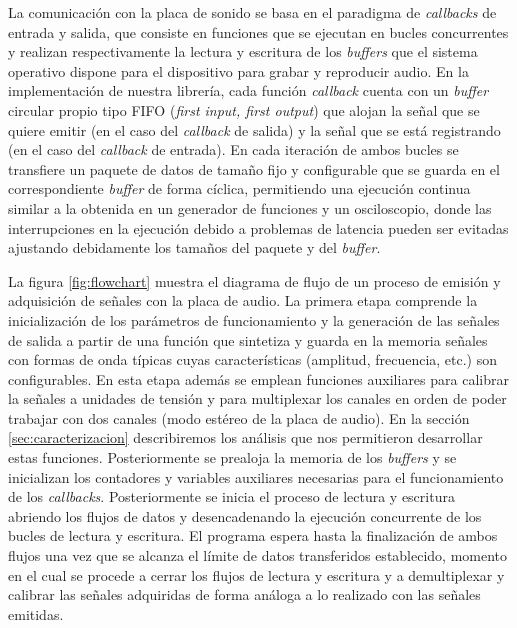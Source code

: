 \documentclass[a4paper,11pt]{article}
\begin{document}
	La comunicación con la placa de sonido se basa en el paradigma de \emph{callbacks} de entrada y salida, que consiste en funciones que se ejecutan en bucles concurrentes y realizan respectivamente la lectura y escritura de los \emph{buffers} que el sistema operativo dispone para el dispositivo para grabar y reproducir audio. En la implementación de nuestra librería, cada función \emph{callback} cuenta con un \emph{buffer} circular propio tipo FIFO (\emph{first input, first output}) que alojan la señal que se quiere emitir (en el caso del \emph{callback} de salida) y la señal que se está registrando (en el caso del \emph{callback} de entrada). En cada iteración de ambos bucles se transfiere un paquete de datos de tamaño fijo y configurable que se guarda en el correspondiente \emph{buffer} de forma cíclica, permitiendo una ejecución continua similar a la obtenida en un generador de funciones y un osciloscopio, donde las interrupciones en la ejecución debido a problemas de latencia pueden ser evitadas ajustando debidamente los tamaños del paquete y del \emph{buffer}.

	La figura \ref{fig:flowchart} muestra el diagrama de flujo de un proceso de emisión y adquisición de señales con la placa de audio. La primera etapa comprende la inicialización de los parámetros de funcionamiento y la generación de las señales de salida a partir de una función que sintetiza y guarda en la memoria señales con formas de onda típicas cuyas características (amplitud, frecuencia, etc.) son configurables. En esta etapa además se emplean funciones auxiliares para calibrar la señales a unidades de tensión y para multiplexar los canales en orden de poder trabajar con dos canales (modo estéreo de la placa de audio). En la sección \ref{sec:caracterizacion} describiremos los análisis que nos permitieron desarrollar estas funciones. Posteriormente se prealoja la memoria de los \emph{buffers} y se inicializan los contadores y variables auxiliares necesarias para el funcionamiento de los \emph{callbacks}. Posteriormente se inicia el proceso de lectura y escritura abriendo los flujos de datos y desencadenando la ejecución concurrente de los bucles de lectura y escritura. El programa espera hasta la finalización de ambos flujos una vez que se alcanza el límite de datos transferidos establecido, momento en el cual se procede a cerrar los flujos de lectura y escritura y a demultiplexar y calibrar las señales adquiridas de forma análoga a lo realizado con las señales emitidas.
	
\end{document}
